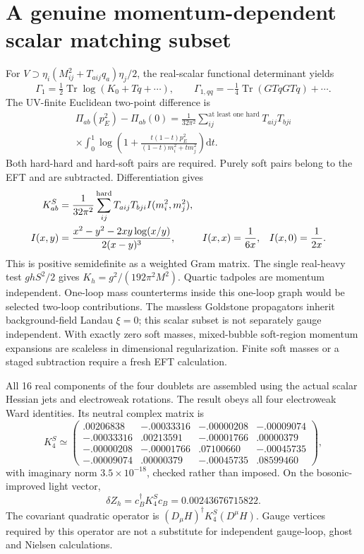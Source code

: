 \documentclass[11pt]{article}
\newcommand{\tr}{\operatorname{Tr}}
\newcommand{\dd}{\mathrm d}
\begin{document}
\section{A genuine momentum-dependent scalar matching subset}
For $V\supset\eta_i(M^2_{ij}+T_{aij}q_a)\eta_j/2$,
the real-scalar functional determinant yields
\begin{equation}
 \Gamma_1=\tfrac12\tr\log(K_0+Tq+\cdots),\qquad
 \Gamma_{1,qq}=-\tfrac14\tr(GTqGTq)+\cdots.
\end{equation}
The UV-finite Euclidean two-point difference is
\begin{multline}
 \Pi_{ab}(p_E^2)-\Pi_{ab}(0)=\frac1{32\pi^2}
 \sum_{ij}^{\text{at least one hard}} T_{aij}T_{bji}\\
 \times\int_0^1\log\left(1+
 \frac{t(1-t)p_E^2}{(1-t)m_i^2+tm_j^2}\right)\dd t.
\end{multline}
Both hard-hard and hard-soft pairs are required. Purely soft pairs
belong to the EFT and are subtracted. Differentiation gives
\begin{align}
 K_{ab}^{S}&=\frac1{32\pi^2}\sum_{ij}^{\rm hard}
 T_{aij}T_{bji}I(m_i^2,m_j^2),\\
 I(x,y)&=\frac{x^2-y^2-2xy\log(x/y)}{2(x-y)^3},&
 I(x,x)&=\frac1{6x},&I(x,0)&=\frac1{2x}.
\end{align}
This is positive semidefinite as a weighted Gram matrix. The single
real-heavy test $ghS^2/2$ gives $K_h=g^2/(192\pi^2M^2)$.
Quartic tadpoles are momentum independent. One-loop mass counterterms
inside this one-loop graph would be selected two-loop contributions.
The massless Goldstone propagators inherit background-field Landau
$\xi=0$; this scalar subset is not separately gauge independent.
With exactly zero soft masses, mixed-bubble soft-region momentum
expansions are scaleless in dimensional regularization. Finite soft
masses or a staged subtraction require a fresh EFT calculation.

All 16 real components of the four doublets are assembled using
the actual scalar Hessian jets and electroweak rotations. The result
obeys all four electroweak Ward identities. Its neutral complex matrix is
\begin{equation}
 K_4^S\simeq\begin{pmatrix}
 .00206838&-.00033316&-.00000208&-.00009074\\
 -.00033316&.00213591&-.00001766&.00000379\\
 -.00000208&-.00001766&.07100660&-.00045735\\
 -.00009074&.00000379&-.00045735&.08599460
 \end{pmatrix},
\end{equation}
with imaginary norm $3.5\times10^{-18}$, checked rather than imposed.
On the bosonic-improved light vector,
\begin{equation}
 \delta Z_h=c_B^\dagger K_4^Sc_B=0.00243676715822.
\end{equation}
The covariant quadratic operator is $(D_\mu H)^\dagger K_4^S(D^\mu H)$.
Gauge vertices required by this operator are not a substitute for
independent gauge-loop, ghost and Nielsen calculations.
\end{document}
